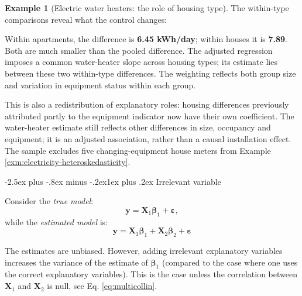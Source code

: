 \documentclass[
  11pt,
]{book}
\makeatletter
\renewcommand\subsection{\@startsection{subsection}{2}{\z@}
  {-2.5ex plus -.8ex minus -.2ex}{1ex plus .2ex}
  {\normalfont\large\bfseries\color{TextbookInk}}}
\theoremstyle{definition}
\theoremstyle{definition}
\newtheorem{example}{Example}[chapter]
\theoremstyle{definition}
\theoremstyle{definition}
\theoremstyle{remark}
\makeatother
\begin{document}
\begin{example}[Electric water heaters: the role of housing type]
The within-type comparisons reveal what the control changes:

\begin{table}[H]
\centering
\caption{\label{tab:electricity-controls-within}Mean grid imports in kWh/day; numbers of meters in parentheses.}
\centering
{}
\end{table}

Within apartments, the difference is \textbf{6.45 kWh/day}; within houses it is \textbf{7.89}. Both are much smaller than the pooled difference. The adjusted regression imposes a common water-heater slope across housing types; its estimate lies between these two within-type differences. The weighting reflects both group size and variation in equipment status within each group.

This is also a redistribution of explanatory roles: housing differences previously attributed partly to the equipment indicator now have their own coefficient. The water-heater estimate still reflects other differences in size, occupancy and equipment; it is an adjusted association, rather than a causal installation effect. The sample excludes five changing-equipment house meters from Example \ref{exm:electricity-heteroskedasticity}.
\end{example}

\subsection{Irrelevant variable}\label{irrelevant}

Consider the \emph{true model}:
\[
\mathbf{y} = \mathbf{X}_1\boldsymbol\beta_1 + \boldsymbol\varepsilon,
\]
while the \emph{estimated model} is:
\[
\mathbf{y} = \mathbf{X}_1\boldsymbol\beta_1 + \mathbf{X}_2\boldsymbol\beta_2 + \boldsymbol\varepsilon
\]

The estimates are unbiased. However, adding irrelevant explanatory variables increases the variance of the estimate of \(\boldsymbol\beta_1\) (compared to the case where one uses the correct explanatory variables). This is the case unless the correlation between \(\mathbf{X}_1\) and \(\mathbf{X}_2\) is null, see Eq. \eqref{eq:multicollin}.
\end{document}

